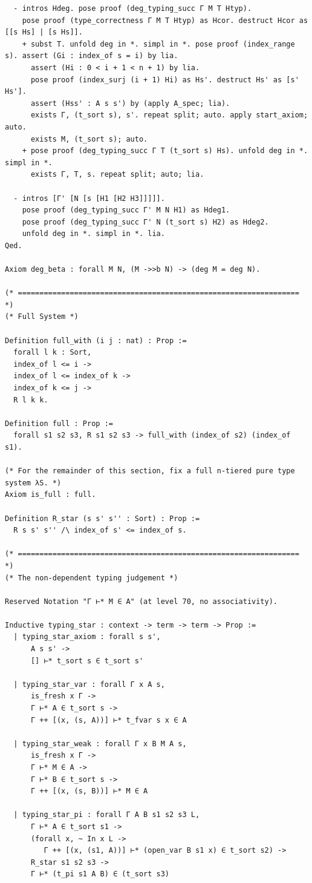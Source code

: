 \begin{latin}
\begin{verbatim}
  - intros Hdeg. pose proof (deg_typing_succ Γ M T Htyp).
    pose proof (type_correctness Γ M T Htyp) as Hcor. destruct Hcor as [[s Hs] | [s Hs]].
    + subst T. unfold deg in *. simpl in *. pose proof (index_range s). assert (Gi : index_of s = i) by lia.
      assert (Hi : 0 < i + 1 < n + 1) by lia.
      pose proof (index_surj (i + 1) Hi) as Hs'. destruct Hs' as [s' Hs'].
      assert (Hss' : A s s') by (apply A_spec; lia).
      exists Γ, (t_sort s), s'. repeat split; auto. apply start_axiom; auto.
      exists M, (t_sort s); auto.
    + pose proof (deg_typing_succ Γ T (t_sort s) Hs). unfold deg in *. simpl in *.
      exists Γ, T, s. repeat split; auto; lia.

  - intros [Γ' [N [s [H1 [H2 H3]]]]].
    pose proof (deg_typing_succ Γ' M N H1) as Hdeg1.
    pose proof (deg_typing_succ Γ' N (t_sort s) H2) as Hdeg2.
    unfold deg in *. simpl in *. lia.
Qed.

Axiom deg_beta : forall M N, (M ->>b N) -> (deg M = deg N).

(* ================================================================= *)
(* Full System *)

Definition full_with (i j : nat) : Prop :=
  forall l k : Sort,
  index_of l <= i ->
  index_of l <= index_of k ->
  index_of k <= j ->
  R l k k.

Definition full : Prop :=
  forall s1 s2 s3, R s1 s2 s3 -> full_with (index_of s2) (index_of s1).

(* For the remainder of this section, fix a full n-tiered pure type system λS. *)
Axiom is_full : full.

Definition R_star (s s' s'' : Sort) : Prop :=
  R s s' s'' /\ index_of s' <= index_of s.

(* ================================================================= *)
(* The non-dependent typing judgement *)

Reserved Notation "Γ ⊢* M ∈ A" (at level 70, no associativity).

Inductive typing_star : context -> term -> term -> Prop :=
  | typing_star_axiom : forall s s',
      A s s' ->
      [] ⊢* t_sort s ∈ t_sort s'

  | typing_star_var : forall Γ x A s,
      is_fresh x Γ ->
      Γ ⊢* A ∈ t_sort s ->
      Γ ++ [(x, (s, A))] ⊢* t_fvar s x ∈ A

  | typing_star_weak : forall Γ x B M A s,
      is_fresh x Γ ->
      Γ ⊢* M ∈ A ->
      Γ ⊢* B ∈ t_sort s ->
      Γ ++ [(x, (s, B))] ⊢* M ∈ A

  | typing_star_pi : forall Γ A B s1 s2 s3 L,
      Γ ⊢* A ∈ t_sort s1 ->
      (forall x, ~ In x L ->
         Γ ++ [(x, (s1, A))] ⊢* (open_var B s1 x) ∈ t_sort s2) ->
      R_star s1 s2 s3 ->
      Γ ⊢* (t_pi s1 A B) ∈ (t_sort s3)


\end{verbatim}
\end{latin}
